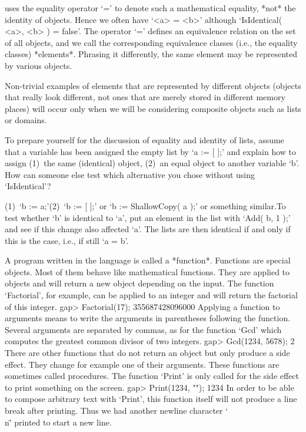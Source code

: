 {\GAP} uses  the   equality operator `=' to  denote   such a mathematical
equality, *not* the identity of objects. Hence we often  have `<a> = <b>'
although `IsIdentical(  <a>, <b> ) = false'.  The operator `=' defines an
equivalence relation on  the set of  all {\GAP} objects,  and we call the
corresponding   equivalence   classes  (i.e.,    the  equality   classes)
*elements*. Phrasing it differently, the  same element may be represented
by various {\GAP} objects.

Non-trivial examples of   elements   that are represented by    different
objects (objects  that really  look different,  not ones  that are merely
stored in  different  memory places)  will  occur only   when  we will be
considering composite objects such as lists or domains.

\exercise To prepare yourself for the discussion of equality and identity
of lists, assume  that a variable has been  assigned the empty list by `a
:=  [ ];' and   explain how to  assign  (1)~the same (identical)  object,
(2)~an equal  object to another variable  `b'. How can someone  else test
which alternative you chose without using `IsIdentical'?

\answer (1)~`b := a;'\quad (2)~`b := [ ];' or `b := ShallowCopy( a );' or
something similar.\quad  To test whether `b'  is identical to `a', put an
element  in the list with  `Add(  b, 1  );'  and see  if this change also
affected `a'.  The lists are then  identical if and only  if  this is the
case, i.e., if still `a = b'.


A  program  written  in  the  {\GAP} language  is  called  a  *function*.
Functions  are   special  {\GAP}  objects.   Most  of  them  behave  like
mathematical functions.  They are applied to  objects and  will return  a
new  object  depending  on  the input.   The  function  `Factorial',  for
example,  can be applied to an  integer and will  return the factorial of
this integer.
\beginexample
    gap> Factorial(17);
    355687428096000 
\endexample
Applying  a  function  to arguments  means  to  write  the  arguments  in
parentheses following the function.   Several arguments are  separated by
commas, as for the  function  `Gcd' which  computes  the greatest  common
divisor of two integers.
\beginexample
    gap> Gcd(1234, 5678);
    2 
\endexample
There are other functions that do not return an object but only produce a
side effect.   They change for  example  one of their  arguments.   These
functions are sometimes called  procedures.  The function `Print' is only
called for the side effect to print something on the screen.
\beginexample
    gap> Print(1234, "\n");
    1234 
\endexample
In order to be able to compose arbitrary text with `Print', this function
itself will not produce a line break  after printing. Thus we had another
newline character `\"\\n\"' printed to start a new line.

